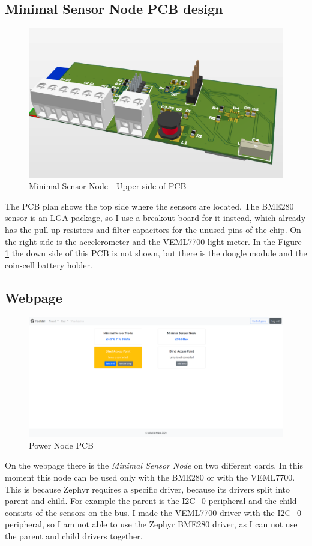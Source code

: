 \subsection{Minimal Sensor Node PCB design}
\begin{figure}[!htb]
    \centering
    \includegraphics[width=\textwidth]{img/minimalsensornodepcb3dupper.png}
    \caption{Minimal Sensor Node - Upper side of PCB}
    \label{fig:powernodepcbup}
\end{figure}
\noindent
The PCB plan shows the top side where the sensors are located. The BME280 sensor is an LGA package, so I use a breakout board for it instead, which already has the pull-up resistors and filter capacitors for the unused pins of the chip. On the right side is the accelerometer and the VEML7700 light meter. In the Figure \ref{fig:powernodepcbup} the down side of this PCB is not shown, but there is the dongle module and the coin-cell battery holder.

\subsection{Webpage}
\begin{figure}[!htb]
    \centering
    \includegraphics[width=\textwidth]{img/minimalsensornodeWebpage.png}
    \caption{Power Node PCB}
    \label{fig:powernodewebpage}
\end{figure}
\noindent
On the webpage there is the \textit{Minimal Sensor Node} on two different cards. In this moment this node can be used only with the BME280 or with the VEML7700. This is because Zephyr requires a specific driver, because its drivers split into parent and child. For example the parent is the I2C\_0 peripheral and the child consists of the sensors on the bus. I made the VEML7700 driver with the I2C\_0 peripheral, so I am not able to use the Zephyr BME280 driver, as I can not use the parent and child drivers together.

